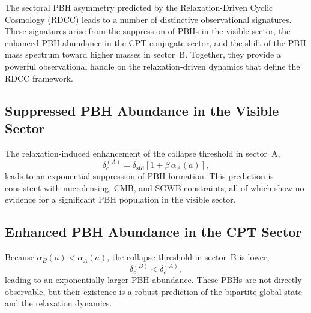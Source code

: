 \documentclass[11pt,a4paper]{article}
\begin{document}
The sectoral PBH asymmetry predicted by the Relaxation-Driven Cyclic Cosmology (RDCC)
leads to a number of distinctive observational signatures. These signatures arise from the
suppression of PBHs in the visible sector, the enhanced PBH abundance in the CPT-conjugate
sector, and the shift of the PBH mass spectrum toward higher masses in sector~B. Together,
they provide a powerful observational handle on the relaxation-driven dynamics that define the
RDCC framework.


\subsection{Suppressed PBH Abundance in the Visible Sector}

The relaxation-induced enhancement of the collapse threshold in sector~A,
\begin{equation}
\delta_{c}^{(A)} = \delta_{\mathrm{std}} \left[ 1 + \beta\, \alpha_{A}(a) \right],
\end{equation}
leads to an exponential suppression of PBH formation. This prediction is consistent with
microlensing, CMB, and SGWB constraints, all of which show no evidence for a significant PBH
population in the visible sector.


\subsection{Enhanced PBH Abundance in the CPT Sector}

Because \(\alpha_{B}(a) < \alpha_{A}(a)\), the collapse threshold in sector~B is lower,
\begin{equation}
\delta_{c}^{(B)} < \delta_{c}^{(A)},
\end{equation}
leading to an exponentially larger PBH abundance. These PBHs are not directly observable, but
their existence is a robust prediction of the bipartite global state and the relaxation dynamics.

\end{document}
